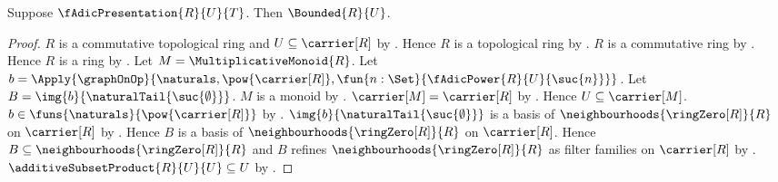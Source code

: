 \begin{theorem}\label{f_adic_presentation_subset_bounded}
    Suppose $\fAdicPresentation{R}{U}{T}$.
    Then $\Bounded{R}{U}$.
\end{theorem}
\begin{proof}
    $R$ is a commutative topological ring and
        $U\subseteq\carrier[R]$ by .
    Hence $R$ is a topological ring by
        .
    $R$ is a commutative ring by
        .
    Hence $R$ is a ring by .
    Let $M=\MultiplicativeMonoid{R}$.
    Let $b=\Apply{\graphOnOp}{
        \naturals,\pow{\carrier[R]},
        \fun{n:\Set}{\fAdicPower{R}{U}{\suc{n}}}}$.
    Let $B=\img{b}{\naturalTail{\suc{\emptyset}}}$.
    $M$ is a monoid by .
    $\carrier[M]=\carrier[R]$ by .
    Hence $U\subseteq\carrier[M]$.
    $b\in\funs{\naturals}{\pow{\carrier[R]}}$ by
        .
    $\img{b}{\naturalTail{\suc{\emptyset}}}$ is a basis of
        $\neighbourhoods{\ringZero[R]}{R}$ on $\carrier[R]$ by
        .
    Hence $B$ is a basis of $\neighbourhoods{\ringZero[R]}{R}$ on
        $\carrier[R]$.
    Hence $B\subseteq\neighbourhoods{\ringZero[R]}{R}$ and
        $B$ refines $\neighbourhoods{\ringZero[R]}{R}$ as filter families
            on $\carrier[R]$ by .
    $\additiveSubsetProduct{R}{U}{U}\subseteq U$ by
        .


\end{proof}
